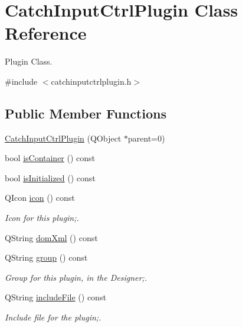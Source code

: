 \hypertarget{class_catch_input_ctrl_plugin}{
\section{CatchInputCtrlPlugin Class Reference}
\label{class_catch_input_ctrl_plugin}
}


Plugin Class.  




{\ttfamily \#include $<$catchinputctrlplugin.h$>$}

\subsection*{Public Member Functions}
\begin{DoxyCompactItemize}
\item 
\hyperlink{class_catch_input_ctrl_plugin_a1834eb9eccaa2a7b4966eed509cae7bc}{CatchInputCtrlPlugin} (QObject $\ast$parent=0)
\item 
bool \hyperlink{class_catch_input_ctrl_plugin_a1a2c7380b2d904e4878d3f7bbe7f57d6}{isContainer} () const 
\item 
bool \hyperlink{class_catch_input_ctrl_plugin_aa61345caf7253e2f205a43507f43bde6}{isInitialized} () const 
\item 
QIcon \hyperlink{class_catch_input_ctrl_plugin_adc87f03a325e9c981762a883f12aed51}{icon} () const 
\begin{DoxyCompactList}\small\item\em Icon for this plugin;. \item\end{DoxyCompactList}\item 
QString \hyperlink{class_catch_input_ctrl_plugin_a1916108461bf1a08e37c8fe9069e980c}{domXml} () const 
\item 
QString \hyperlink{class_catch_input_ctrl_plugin_a2e9a0a0ec3a9484f2c7bd3475519aafc}{group} () const 
\begin{DoxyCompactList}\small\item\em Group for this plugin, in the Designer;. \item\end{DoxyCompactList}\item 
QString \hyperlink{class_catch_input_ctrl_plugin_a18718a7ff1e4614583361193cef4c218}{includeFile} () const 
\begin{DoxyCompactList}\small\item\em Include file for the plugin;. \item\end{DoxyCompactList}\item 

\end{DoxyCompactItemize}
